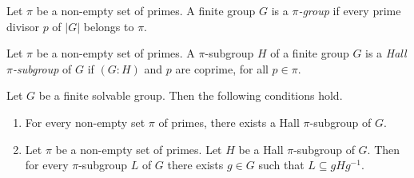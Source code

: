 \begin{definition}
Let $\pi$ be a non-empty set of primes. A finite group $G$ is a {\em $\pi$-group} if every prime divisor $p$ of $|G|$ belongs to $\pi$.  
\end{definition}

\begin{definition}
Let $\pi$ be a non-empty set of primes. A $\pi$-subgroup $H$ of a finite group $G$ is a {\em Hall $\pi$-subgroup} of $G$ if $(G:H)$ and $p$ are coprime, for all $p\in \pi$.
\end{definition}

\begin{theorem}[Hall]\label{thm:Hall_pi_subgroup} 
Let $G$ be a finite solvable group. Then the following conditions hold.
\begin{enumerate}
    \item For every non-empty set $\pi$ of primes, there exists a Hall $\pi$-subgroup of $G$.
    \item Let $\pi$ be a non-empty set of primes. Let $H$ be a Hall $\pi$-subgroup of $G$. Then for every
    $\pi$-subgroup $L$ of $G$ there exists $g\in G$ such that $L\subseteq gHg^{-1}$.
\end{enumerate}
\end{theorem}

